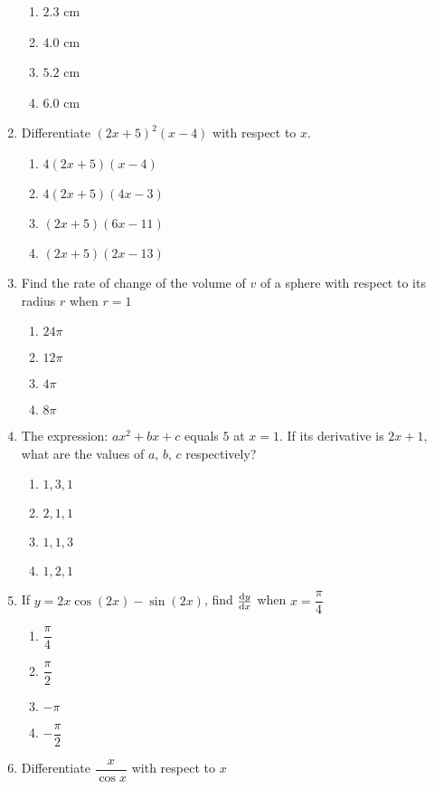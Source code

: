 \begin{multicols}{2}
\begin{enumerate}[label={\arabic*.}]
	\begin{enumerate}[label={\Alph*.}]
	\item \(2.3\) cm
	\item \(4.0\) cm
	\item \(5.2\) cm
	\item \(6.0\) cm
	\end{enumerate}
\item Differentiate \((2x+5)^{2}(x-4)\) with respect to \(x\).
	\begin{enumerate}[label={\Alph*.}]
	\item \(4(2x+5)(x-4)\)
	\item \(4(2x+5)(4x-3)\)
	\item \((2x+5)(6x-11)\)
	\item \((2x+5)(2x-13)\)
	\end{enumerate}
\item Find the rate of change of the volume of \(v\) of a sphere with respect to its radius \(r\) when \(r = 1\)
	\begin{enumerate}[label={\Alph*.}]
	\item \(24\pi\)
	\item \(12\pi\)
	\item \(4\pi\)
	\item \(8\pi\)
	\end{enumerate}
\item The expression: \(a{x}^{2}+bx+c\) equals \(5\) at \(x = 1\). If its derivative is \(2x+1\), what are the values of \(a\), \(b\), \(c\) respectively?
	\begin{enumerate}[label={\Alph*.}]
	\item \(1, 3, 1\)
	\item \(2, 1, 1\)
	\item \(1, 1, 3\)
	\item \(1, 2, 1\)
	\end{enumerate}
\item If \(y = 2x\cos{(2x)}-\sin{(2x)}\), find \(\dv{y}{x}\) when \(x=\dfrac{\pi}{4}\)
	\begin{enumerate}[label={\Alph*.}]
	\item \(\dfrac{\pi}{4}\)
	\item \(\dfrac{\pi}{2}\)
	\item \(-\pi\)
	\item \(-{\dfrac{\pi}{2}}\)
	\end{enumerate}
\item Differentiate \(\dfrac{x}{\cos x}\) with respect to \(x\)
	\begin{enumerate}[label={\Alph*.}]

\end{enumerate}
\end{enumerate}
\end{multicols}
